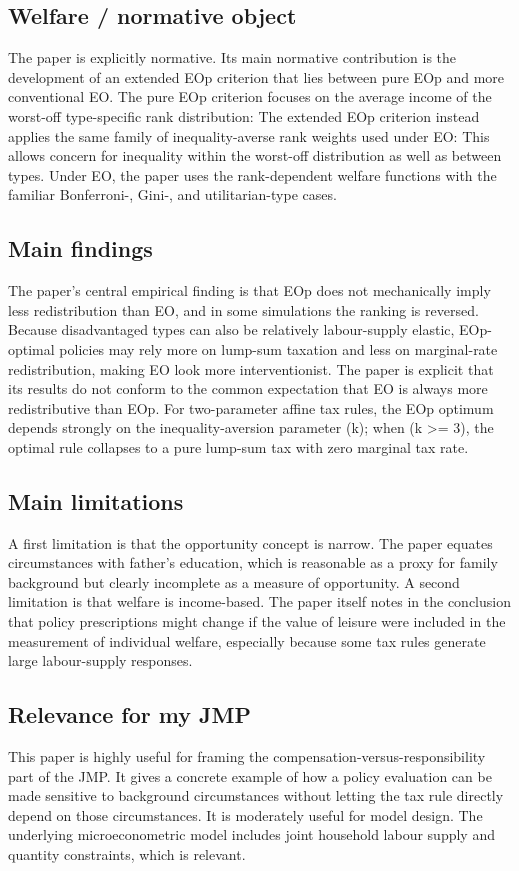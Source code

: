 \documentclass[11pt,a4paper]{article}
\begin{document}
\subsection*{Welfare / normative object}
The paper is explicitly normative. Its main normative contribution is the development of an extended EOp criterion that lies between pure EOp and more conventional EO. The pure EOp criterion focuses on the average income of the worst-off type-specific rank distribution: The extended EOp criterion instead applies the same family of inequality-averse rank weights used under EO: This allows concern for inequality within the worst-off distribution as well as between types. Under EO, the paper uses the rank-dependent welfare functions with the familiar Bonferroni-, Gini-, and utilitarian-type cases.

\subsection*{Main findings}
The paper's central empirical finding is that EOp does not mechanically imply less redistribution than EO, and in some simulations the ranking is reversed. Because disadvantaged types can also be relatively labour-supply elastic, EOp-optimal policies may rely more on lump-sum taxation and less on marginal-rate redistribution, making EO look more interventionist. The paper is explicit that its results do not conform to the common expectation that EO is always more redistributive than EOp. For two-parameter affine tax rules, the EOp optimum depends strongly on the inequality-aversion parameter (k); when (k >= 3), the optimal rule collapses to a pure lump-sum tax with zero marginal tax rate.

\subsection*{Main limitations}
A first limitation is that the opportunity concept is narrow. The paper equates circumstances with father’s education, which is reasonable as a proxy for family background but clearly incomplete as a measure of opportunity. A second limitation is that welfare is income-based. The paper itself notes in the conclusion that policy prescriptions might change if the value of leisure were included in the measurement of individual welfare, especially because some tax rules generate large labour-supply responses.

\subsection*{Relevance for my JMP}
This paper is highly useful for framing the compensation-versus-responsibility part of the JMP. It gives a concrete example of how a policy evaluation can be made sensitive to background circumstances without letting the tax rule directly depend on those circumstances. It is moderately useful for model design. The underlying microeconometric model includes joint household labour supply and quantity constraints, which is relevant.
\end{document}

